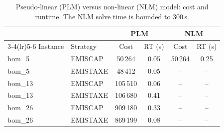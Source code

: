 \begin{table}[!htbp]\centering\small
\caption{Pseudo-linear (PLM) versus non-linear (NLM) model: cost and runtime. The NLM solve time is bounded to 300\,s.}\label{tab:plmnlm}
\begin{tabular}{llcccc}
\toprule
 & & \multicolumn{2}{c}{PLM} & \multicolumn{2}{c}{NLM}\\
\cmidrule(lr){3-4}\cmidrule(lr){5-6}
Instance & Strategy & Cost & RT (s) & Cost & RT (s)\\
\midrule
bom\_5 & EMISCAP & 50\,264 & 0.05 & 50\,264 & 0.25 \\
bom\_5 & EMISTAXE & 48\,412 & 0.05 & -- & -- \\
bom\_13 & EMISCAP & 105\,510 & 0.06 & -- & -- \\
bom\_13 & EMISTAXE & 106\,680 & 0.41 & -- & -- \\
bom\_26 & EMISCAP & 909\,180 & 0.33 & -- & -- \\
bom\_26 & EMISTAXE & 869\,199 & 0.08 & -- & -- \\
\bottomrule
\end{tabular}
\end{table}
